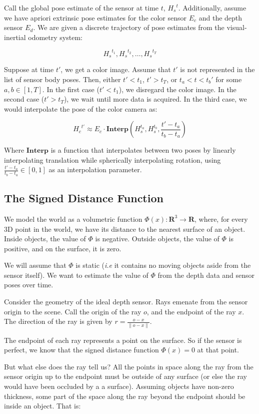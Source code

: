 \documentclass[conference,10pt]{IEEEtran}
\begin{document}
Call the global pose estimate of the sensor at time $t$,  ${H_{s}}^t$.
Additionally, assume we have apriori extrinsic pose estimates for the color
sensor ${E_{c}}$ and the depth sensor ${E_{d}}$. We are given a discrete
trajectory of pose estimates from the visual-inertial odometry system:

$$ {H_{s}}^{t_1}, {H_{s}}^{t_2}, \ldots, {H_{s}}^{t_T} $$

Suppose at time $t'$, we get a color image. Assume that $t'$ is not represented
in the list of sensor body poses. Then, either $t' < t_1$,  $t' > t_T$, or
$t_a < t < t_b'$ for some $a, b \in [1, T]$. In the first case ($t' < t_1$), we
disregard the color image. In the second case ($t' > t_T$), we wait until more data is
acquired. In the third case, we would interpolate the pose of the color camera
as:

$$ {H_{c}}^{t'} \approx E_c \cdot \textbf{Interp}\left(H_{s}^{t_a}, H_{s}^{t_b},
\frac{t' - t_a}{t_b - t_a}\right) $$

Where $\textbf{Interp}$ is a function that  interpolates between two
poses by linearly interpolating translation while spherically interpolating
rotation, using $\frac{t' - t_a}{t_b - t_a} \in [0, 1]$ as an interpolation
parameter. 

\subsection{The Signed Distance Function}
We model the world as a volumetric function $\Phi(x) : \mathbf{R}^3 \to
\mathbf{R}$, where, for every 3D point in the world, we have its distance to the
nearest surface of an object. Inside objects, the value of $\Phi$ is negative.
Outside objects, the value of $\Phi$ is positive, and on the surface, it is
zero.

 We will assume that $\Phi$ is static (\textit{i.e} it contains no moving
 objects aside from the sensor itself). We want to estimate the value of $\Phi$
 from the depth data and sensor poses over time.

Consider the geometry of the ideal depth sensor. Rays emenate from the sensor
origin to the scene. Call the origin of the ray $o$, and the endpoint of the ray
$x$. The direction of the ray is given by $r = \frac{o - x}{\|o - x\|}$.

The endpoint of each ray represents a point on the surface. So if the sensor is
perfect, we know that the signed distance function $\Phi(x) = 0$ at that point. 

But what else does the ray tell us? All the points in space along the ray from
the sensor origin up to the endpoint must be outside of any surface (or else the
ray would have been occluded by a a surface). Assuming objects have non-zero
thickness, some part of the space along the ray beyond the endpoint should be
inside an object. That is:
\end{document}
